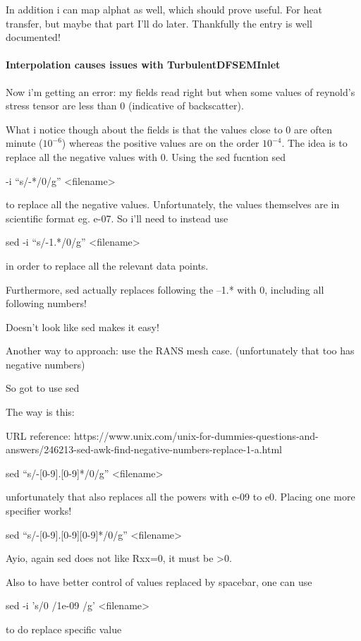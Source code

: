 \documentclass[12pt]{article}
\renewcommand{\_}{\kern-1.5pt\textunderscore\kern-1.5pt}
\begin{document}
In addition i can map alphat as well, which should prove useful. For
heat transfer, but maybe that part I'll do later. Thankfully the entry
is well documented!

\paragraph{Interpolation causes issues with TurbulentDFSEMInlet}

Now i'm getting an error: my fields read right but when some values
of reynold's stress tensor are less than 0 (indicative of backscatter). 

What i notice though about the fields is that the values close to
0 are often minute ($10^{-6}$) whereas the positive values are on
the order $10^{-4}$. The idea is to replace all the negative values
with 0. Using the sed fucntion sed 

-i ``s/-{*}/0/g'' <filename> 

to replace all the negative values. Unfortunately, the values themselves
are in scientific format eg. e-07. So i'll need to instead use 

sed -i ``s/-1.{*}/0/g'' <filename> 

in order to replace all the relevant data points.

Furthermore, sed actually replaces following the --1.{*} with 0,
including all following numbers!

Doesn't look like sed makes it easy!

Another way to approach: use the RANS mesh case. (unfortunately that
too has negative numbers)

So got to use sed

The way is this: 

URL reference: https://www.unix.com/unix-for-dummies-questions-and-answers/246213-sed-awk-find-negative-numbers-replace-1-a.html

sed ``s/-{[}0-9{]}.{[}0-9{]}{*}/0/g'' <filename>

unfortunately that also replaces all the powers with e-09 to e0. Placing
one more specifier works!

sed ``s/-{[}0-9{]}.{[}0-9{]}{[}0-9{]}{*}/0/g'' <filename>

Ayio, again sed does not like R\_xx=0, it must be >0. 

Also to have better control of values replaced by spacebar, one can
use 

sed -i 's/0 /1e-09 /g' <filename>

to do replace specific value
\end{document}

